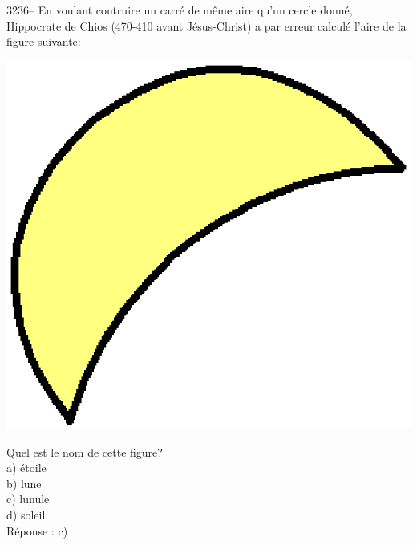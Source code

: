 \documentclass[letterpaper, 12pt]{article}
\begin{document}
3236-- En voulant contruire un carr\'e de m\^eme aire qu'un cercle donn\'e, Hippocrate de Chios (470-410 avant J\'esus-Christ) a par erreur calcul\'e l'aire de la figure suivante: 
\begin{center}
\includegraphics[scale=0.25]{lunule.eps}\\[5mm]
\end{center}
Quel est le nom de cette figure?\\

a) \'etoile\\
b) lune\\
c) lunule\\
d) soleil\\

R\'eponse : c)\\
\end{document}
